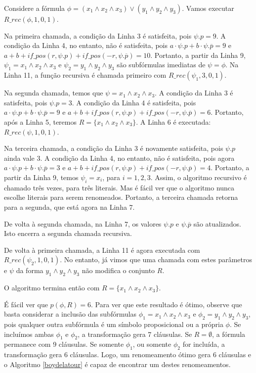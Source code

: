 \begin{example}
	Considere a fórmula $\phi = (x_1 \wedge x_2 \wedge x_3) \vee (y_1 \wedge y_2 \wedge y_3)$. Vamos executar $R\_rec(\phi,1,0,1)$.
	
	Na primeira chamada, a condição da Linha 3 é satisfeita, pois $\psi.p = 9$. A condição da Linha 4, no entanto, não é satisfeita, pois $a \cdot \psi.p + b \cdot \psi.\overline{p} = 9$ e $a + b + if\_pos(r,\psi.p) + if\_pos(-r,\psi.\overline{p}) = 10$. Portanto, a partir da Linha 9, $\psi_1 = x_1 \wedge x_2 \wedge x_3$ e $\psi_2 = y_1 \wedge y_2 \wedge y_3$ são subfórmulas imediatas de $\psi = \phi$. Na Linha 11, a função recursiva é chamada primeiro com $R\_rec(\psi_1,3,0,1)$.
	
	Na segunda chamada, temos que $\psi = x_1 \wedge x_2 \wedge x_3$. A condição da Linha 3 é satisfeita, pois $\psi.p = 3$. A condição da Linha 4 é satisfeita, pois $a \cdot \psi.p + b \cdot \psi.\overline{p} = 9$ e $a + b + if\_pos(r,\psi.p) + if\_pos(-r,\psi.\overline{p}) = 6$. Portanto, após a Linha 5, teremos $R = \{x_1 \wedge x_2 \wedge x_3 \}$. A Linha 6 é executada: $R\_rec(\psi,1,0,1)$.
	
	Na terceira chamada, a condição da Linha 3 é novamente satisfeita, pois $\psi.p$ ainda vale 3. A condição da Linha 4, no entanto, não é satisfeita, pois agora $a \cdot \psi.p + b \cdot \psi.\overline{p} = 3$ e $a + b + if\_pos(r,\psi.p) + if\_pos(-r,\psi.\overline{p}) = 4$. Portanto, a partir da Linha 9, temos $\psi_i = x_i$, para $i=1,2,3$. Assim, o algoritmo recursivo é chamado três vezes, para três literais. Mas é fácil ver que o algoritmo nunca escolhe literais para serem renomeados. Portanto, a terceira chamada retorna para a segunda, que está agora na Linha 7.
	
	De volta à segunda chamada, na Linha 7, os valores $\psi.p$ e $\psi.\overline{p}$ são atualizados. Isto encerra a segunda chamada recursiva.
	
	De volta à primeira chamada, a Linha 11 é agora executada com $R\_rec(\psi_2,1,0,1)$. No entanto, já vimos que uma chamada com estes parâmetros e $\psi$ da forma $y_1 \wedge y_2 \wedge y_3$ não modifica o conjunto $R$.
	
	O algoritmo termina então com $R = \{x_1 \wedge x_2 \wedge x_3 \}$.
	
	É fácil ver que $p(\phi,R) = 6$. Para ver que este resultado é ótimo, observe que basta considerar a inclusão das subfórmulas $\phi_1 = x_1 \wedge x_2 \wedge x_3$ e $\phi_2 = y_1 \wedge y_2 \wedge y_3$, pois qualquer outra subfórmula é um símbolo proposicional ou a própria $\phi$. Se incluímos ambas $\phi_1$ e $\phi_2$, a transformação gera 7 cláusulas. Se $R = \emptyset$, a fórmula permanece com 9 cláusulas. Se somente $\phi_1$, ou somente $\phi_2$ for incluída, a transformação gera 6 cláusulas. Logo, um renomeamento ótimo gera 6 cláusulas e o Algoritmo \ref{boydelatour} é capaz de encontrar um destes renomeamentos.
\end{example}

